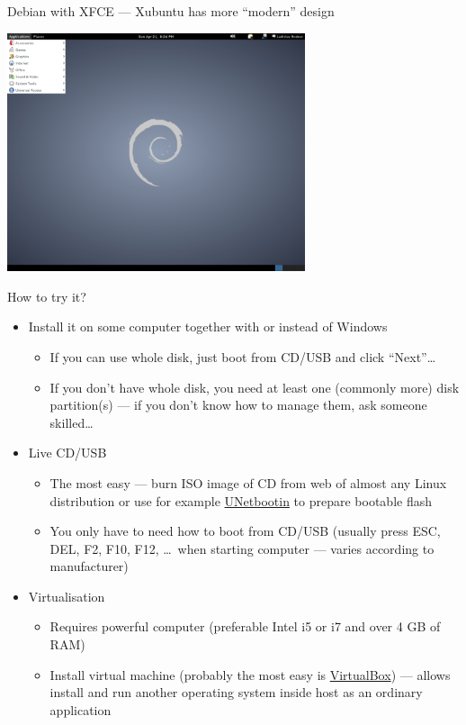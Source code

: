 \documentclass[hyperref={bookmarks=true, unicode=true, colorlinks=true, pdftitle={Linux, command line and MetaCentrum}, plainpages=false, pdfauthor={Vojtech Zeisek}, pdfsubject={Course about use of Linux command line, writing shell scripts and using MetaCentrum of CESNET}, pdfcreator={XeLaTeX, http://www.xelatex.org/}, pdfkeywords={Linux, GNU, BASH, shell, command line, MetaCentrum}, linkcolor=Sienna, anchorcolor=black, citecolor=green, filecolor=magenta, menucolor=Sienna, urlcolor=cyan, pdftex}, compress, ucs, xelatex, xcolor=svgnames, 11pt]{beamer}
\begin{document}
\begin{frame}{Debian with XFCE --- Xubuntu has more ``modern'' design}
\begin{center}
  \includegraphics[height=7cm]{debian.png}
\end{center}
\end{frame}

\begin{frame}{How to try it?}
\begin{itemize}
  \item Install it on some computer together with or instead of Windows
  \begin{itemize}
    \item If you can use whole disk, just boot from CD/USB and click ``Next''\ldots
    \item If you don't have whole disk, you need at least one (commonly more) disk partition(s) --- if you don't know how to manage them, ask someone skilled\ldots
  \end{itemize}
  \item Live CD/USB
  \begin{itemize}
    \item The most easy --- burn ISO image of CD from web of almost any Linux distribution or use for example \href{http://unetbootin.sourceforge.net/}{UNetbootin} to prepare bootable flash
    \item You only have to need how to boot from CD/USB (usually press ESC, DEL, F2, F10, F12, \ldots~when starting computer --- varies according to manufacturer)
  \end{itemize}
  \item Virtualisation
  \begin{itemize}
    \item Requires powerful computer (preferable Intel i5 or i7 and over 4 GB of RAM)
    \item Install virtual machine (probably the most easy is \href{https://www.virtualbox.org/}{VirtualBox}) --- allows install and run another operating system inside host as an ordinary application
  \end{itemize}
\end{itemize}
\end{frame}
\end{document}
